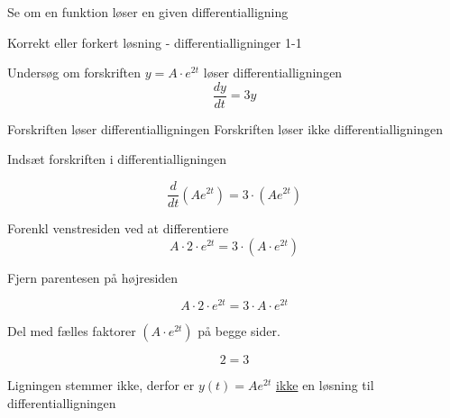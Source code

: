 \documentclass{article}
\begin{document}
Se om en funktion løser en given differentialligning
\tableofcontents
\newpage

\begin{exercise}{Korrekt eller forkert løsning - differentialligninger 1-1}


Undersøg om forskriften $y = A \cdot e^{2t}$ løser differentialligningen
\[
\frac{dy}{dt} = 3y
\]

\begin{multichoice}
\itemfalse Forskriften løser differentialligningen 
\itemtrue Forskriften løser ikke differentialligningen 
\end{multichoice}

\hint

Indsæt forskriften i differentialligningen

\hint
\[
\frac{d}{dt} \left( A e^{2t}\right) = 3 \cdot \left( A e^{2t} \right)
\]


\hint

Forenkl venstresiden ved at differentiere
\[
A \cdot 2 \cdot e^{2t} = 3 \cdot \left(A \cdot e^{2t} \right)
\]

\hint

Fjern parentesen på højresiden

\hint
\[
A \cdot 2 \cdot e^{2t} = 3 \cdot A \cdot e^{2t}
\]

\hint
Del med fælles faktorer $\left( A \cdot e^{2t} \right)$ på begge sider.

\hint

\[
2 = 3
\]


\hint

Ligningen stemmer ikke, derfor er $y(t) = A e^{2t}$ \underline{ikke} en løsning til differentialligningen

\end{exercise}

\newpage
\end{document}
